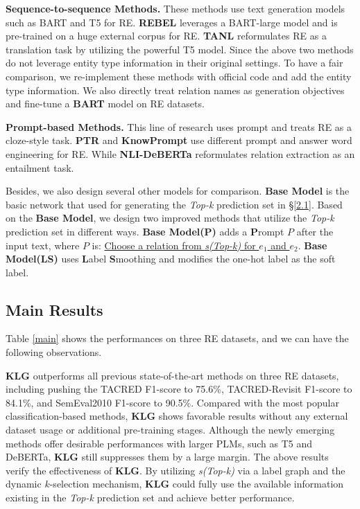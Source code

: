 \textbf{Sequence-to-sequence Methods.} These methods use text generation models such as BART \cite{lewis-etal-2020-bart} and T5 \cite{DBLP:journals/jmlr/RaffelSRLNMZLL20} for RE. 
\textbf{REBEL} \cite{DBLP:conf/emnlp/CabotN21} leverages a BART-large model and is pre-trained on a huge external corpus for RE. \textbf{TANL}\cite{DBLP:conf/iclr/PaoliniAKMAASXS21} reformulates RE as a translation task by utilizing the powerful T5 model. Since the above two methods do not leverage entity type information in their original settings. To have a fair comparison, we re-implement these methods with official code and add the entity type information. We also directly treat relation names as generation objectives and fine-tune a \textbf{BART} model on RE datasets.

\textbf{Prompt-based Methods.} This line of research uses prompt and treats RE as a cloze-style task. \textbf{PTR} \cite{DBLP:journals/corr/abs-2105-11259} and \textbf{KnowPrompt} \cite{DBLP:conf/www/ChenZXDYTHSC22} use different prompt and answer word engineering for RE. While \textbf{NLI-DeBERTa} \cite{DBLP:conf/emnlp/SainzLLBA21} reformulates relation extraction as an entailment task.

Besides, we also design several other models for comparison. \textbf{Base Model} is the basic network that used for generating the \textit{Top-k} prediction set in \S \ref{2.1}. Based on the \textbf{Base Model}, we design two improved methods that utilize the \textit{Top-k} prediction set in different ways. \textbf{Base Model(P)} adds a \textbf{P}rompt $P$ after the input text, where $P$ is: \uline{Choose a relation from \textit{s(Top-k)} for $e_1$ and $e_2$}. \textbf{Base Model(LS)} uses \textbf{L}abel \textbf{S}moothing \cite{DBLP:conf/icml/IoffeS15} and modifies the one-hot label as the soft label. 


\subsection{Main Results}\label{main_result}
Table \ref{main} shows the performances on three RE datasets, and we can have the following observations.

\textbf{KLG} outperforms all previous state-of-the-art methods on three RE datasets, including pushing the TACRED F1-score to 75.6\%, TACRED-Revisit F1-score to 84.1\%, and SemEval2010 F1-score to 90.5\%. Compared with the most popular classification-based methods, \textbf{KLG} shows favorable results without any external dataset usage or additional pre-training stages. Although the newly emerging methods offer desirable performances with larger PLMs, such as T5 and DeBERTa, \textbf{KLG} still suppresses them by a large margin. The above results verify the effectiveness of \textbf{KLG}. By utilizing \textit{s(Top-k)} via a label graph and the dynamic $k$-selection mechanism, \textbf{KLG} could fully use the available information existing in the \textit{Top-k} prediction set and achieve better performance.
    
